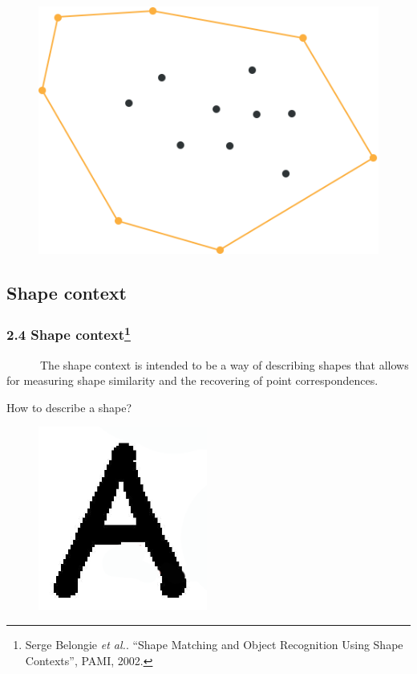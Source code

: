 \documentclass[notheorems,serif,table,compress]{beamer}  %
\begin{document}
\begin{frame}
\begin{itemize}
\begin{figure}
\begin{minipage}[t]{0.35\linewidth}
              \end{minipage}
        \end{figure}
        \pause
        \begin{figure}
              \centering
              \includegraphics[width=0.35\linewidth]{quick3} 
        \end{figure}
    \end{itemize}
\end{frame}

\subsection{Shape context}

\begin{frame}        
\frametitle{2.4 Shape context\footnote{Serge Belongie \textit{et al.}. ``Shape Matching and Object Recognition Using Shape Contexts'', PAMI, 2002.}}
~~~~~~The shape context is intended to be a way of describing shapes that allows for measuring shape similarity and the recovering of point correspondences.\newline

{\color{blue}How to describe a shape?}
            \begin{figure}
              \centering
              \includegraphics[width=0.3\linewidth]{a1}
            \end{figure}
\end{frame}
\end{document}
